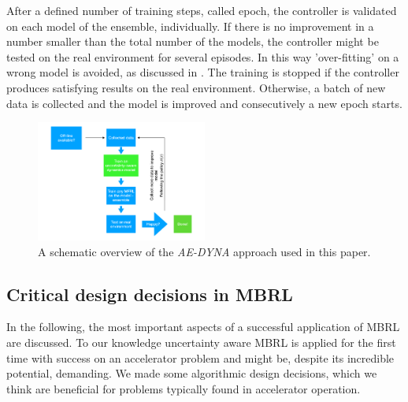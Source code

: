 \documentclass[
reprint,
amsmath,amssymb,amsfonts,clevref,
aps,
prstab,
]{revtex4-2}
\begin{document}
	  After a defined number of training steps, called epoch, the controller is validated on each model of the ensemble, individually. If there is no improvement in a number smaller than the total number of the models, the controller might be tested on the real environment for several episodes. In this way 'over-fitting' on a wrong model is avoided, as discussed in \cite{Kurutach2018}. The training is stopped if the controller produces satisfying results on the real environment. Otherwise, a batch of new data is collected and the model is improved and consecutively a new epoch starts.
	\begin{figure}[!h]
		\centering
		\includegraphics*[width=0.5\textwidth]{Figures/MBRL_overview}
		\caption{A schematic overview of the \emph{AE-DYNA} approach used in this paper.}
		\label{fig:MBRL_overview}
	\end{figure}
	\subsection{Critical design decisions in MBRL}\label{ss:critical_design}
In the following, the most important aspects of a successful application of MBRL are discussed. To our knowledge uncertainty aware MBRL is applied for the first time with success on an accelerator problem and might be, despite its incredible potential, demanding. We made some algorithmic design decisions, which we think are beneficial for problems typically found in accelerator operation.\\
\end{document}
